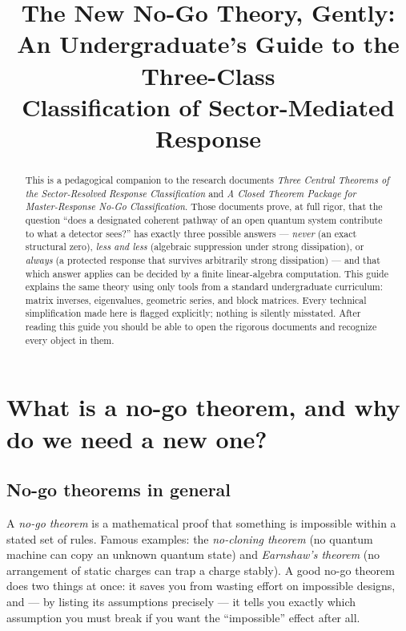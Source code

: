 \documentclass[11pt]{article}
\title{The New No-Go Theory, Gently:\\
An Undergraduate's Guide to the Three-Class\\
Classification of Sector-Mediated Response}
\author{}
\date{}
\begin{document}
\maketitle

\begin{abstract}
This is a pedagogical companion to the research documents
\emph{Three Central Theorems of the Sector-Resolved Response Classification}
and \emph{A Closed Theorem Package for Master-Response No-Go Classification}.
Those documents prove, at full rigor, that the question ``does a designated
coherent pathway of an open quantum system contribute to what a detector
sees?'' has exactly three possible answers --- \emph{never} (an exact
structural zero), \emph{less and less} (algebraic suppression under strong
dissipation), or \emph{always} (a protected response that survives arbitrarily
strong dissipation) --- and that which answer applies can be decided by a
finite linear-algebra computation.  This guide explains the same theory using
only tools from a standard undergraduate curriculum: matrix inverses,
eigenvalues, geometric series, and block matrices.  Every technical
simplification made here is flagged explicitly; nothing is silently
misstated.  After reading this guide you should be able to open the rigorous
documents and recognize every object in them.
\end{abstract}

\tableofcontents

\section{What is a no-go theorem, and why do we need a new one?}

\subsection{No-go theorems in general}

A \emph{no-go theorem} is a mathematical proof that something is impossible
within a stated set of rules.  Famous examples: the \emph{no-cloning theorem}
(no quantum machine can copy an unknown quantum state) and
\emph{Earnshaw's theorem} (no arrangement of static charges can trap a charge
stably).  A good no-go theorem does two things at once: it saves you from
wasting effort on impossible designs, and --- by listing its assumptions
precisely --- it tells you exactly which assumption you must break if you want
the ``impossible'' effect after all.
\end{document}
